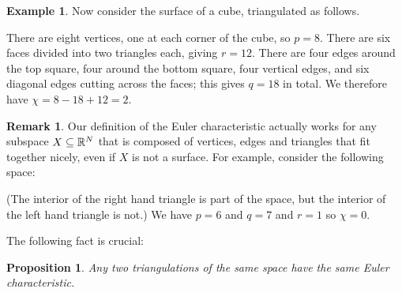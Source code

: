 \documentclass[reqno]{amsart}
\newtheorem{proposition}[theorem]{Proposition}
\theoremstyle{definition}
\newtheorem{remark}[theorem]{Remark}
\newtheorem{example}[theorem]{Example}
\begin{document}
\begin{example}\label{eg-cube-euler}
 Now consider the surface of a cube, triangulated as follows.
 \begin{center}
 \end{center}
 There are eight vertices, one at each corner of the cube, so $p=8$.
 There are six faces divided into two triangles each, giving $r=12$.
 There are four edges around the top square, four around the bottom
 square, four vertical edges, and six diagonal edges cutting across
 the faces; this gives $q=18$ in total.  We therefore have
 $\chi=8-18+12=2$. 
\end{example}

\begin{remark}\label{rem-euler-not-surface}
 Our definition of the Euler characteristic actually works for any
 subspace $X\subseteq\mathbb{R}^N$ that is composed of vertices, edges and
 triangles that fit together nicely, even if $X$ is not a surface.
 For example, consider the following space:
 \begin{center}
 \end{center}
 (The interior of the right hand triangle is part of the space, but
 the interior of the left hand triangle is not.)  We have $p=6$ and
 $q=7$ and $r=1$ so $\chi=0$.
\end{remark}

The following fact is crucial:
\begin{proposition}\label{prop-euler-unique}
 Any two triangulations of the same space have the same Euler
 characteristic. 
\end{proposition}
\end{document}
